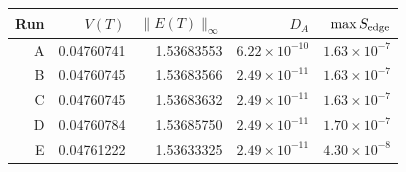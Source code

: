 \begin{tabular}{rrrrr}
\toprule
Run & $V(T)$ & $\|E(T)\|_\infty$ & $D_A$ & $\max S_{\rm edge}$ \\
\midrule
A & 0.04760741 & 1.53683553 & $6.22\times10^{-10}$ & $1.63\times10^{-7}$ \\
B & 0.04760745 & 1.53683566 & $2.49\times10^{-11}$ & $1.63\times10^{-7}$ \\
C & 0.04760745 & 1.53683632 & $2.49\times10^{-11}$ & $1.63\times10^{-7}$ \\
D & 0.04760784 & 1.53685750 & $2.49\times10^{-11}$ & $1.70\times10^{-7}$ \\
E & 0.04761222 & 1.53633325 & $2.49\times10^{-11}$ & $4.30\times10^{-8}$ \\
\bottomrule
\end{tabular}
